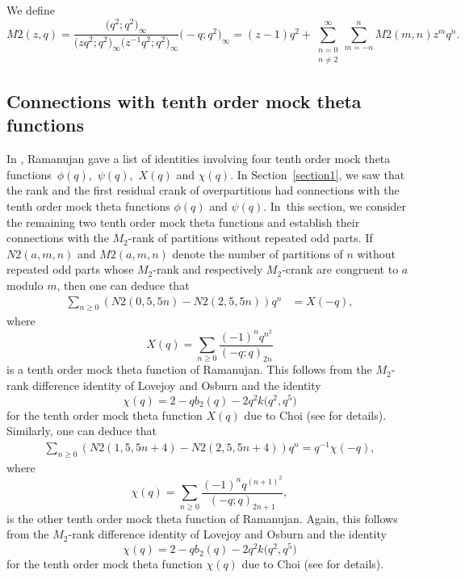 \documentclass[10pt,a4paper]{amsart}
\numberwithin{equation}{section}
\begin{document}
We define \begin{equation*}%
M2(z,q) = \dfrac{\bigl(q^2;q^2\bigr)_{\infty}}{\bigl(zq^2;q^2\bigr)_{\infty}\bigl(z^{-1}q^2;q^2\bigr)_{\infty}}\bigl(-q;q^2\bigr)_{\infty} = (z-1)q^2 + \sum_{\substack{n=0\\ n\neq 2}}^\infty \sum_{m=-n}^n M2(m,n) z^m q^n.
\end{equation*}

\subsection{Connections with tenth order mock theta functions}

In \cite[p.~9]{Ra88}, Ramanujan gave a list of identities involving four tenth order mock theta functions~$\phi(q)$,~$\psi(q)$,~$X(q)$ and $\chi(q)$. In Section~\ref{section1}, we saw that the rank and the first residual crank of overpartitions had connections with the tenth order mock theta functions $\phi(q)$ and $\psi(q)$. In~this section, we consider the remaining two tenth order mock theta functions and establish their connections with the $M_2$-rank of partitions without repeated odd parts. If $N2(a,m,n)$ and $M2(a,m,n)$ denote the number of partitions of $n$ without repeated odd parts whose $M_2$-rank and respectively $M_2$-crank are congruent to $a$ modulo $m$, then one can deduce that
\begin{align*}
\sum_{n\geq 0}(N2(0,5,5n)-N2(2,5,5n))q^n&=X(-q),
\end{align*}
where
\begin{equation*}
X(q)=\sum\limits_{n\geq 0}\frac{(-1)^nq^{n^2}}{(-q;q)_{2n}}
\end{equation*}
is a tenth order mock theta function of Ramanujan. This follows from the $M_2$-rank difference identity of Lovejoy and Osburn \cite[equation~(1.11)]{Lo-Os09} and the identity
\begin{equation*}
\chi(q)=2-qb_2(q)-2q^2k\bigl(q^2,q^5\bigr)
\end{equation*}
for the tenth order mock theta function $X(q)$ due to Choi ({see \cite[p.~183]{Ch00} for details}). Similarly, one can deduce that
\begin{align*}
\sum_{n\geq 0}(N2(1,5,5n+4)-N2(2,5,5n+4))q^n=q^{-1}\chi(-q),
\end{align*}
where
\[
\chi(q)=\sum\limits_{n\geq 0}\frac{(-1)^nq^{(n+1)^2}}{(-q;q)_{2n+1}},
\]
is the other tenth order mock theta function of Ramanujan. Again, this follows from the $M_2$-rank difference identity of Lovejoy and Osburn \cite[equation~(1.10)]{Lo-Os09} and the identity
\begin{equation*}
\chi(q)=2-qb_2(q)-2q^2k\bigl(q^2,q^5\bigr)
\end{equation*}
for the tenth order mock theta function $\chi(q)$ due to Choi (see \cite[p.~183]{Ch00} for details).
\end{document}
